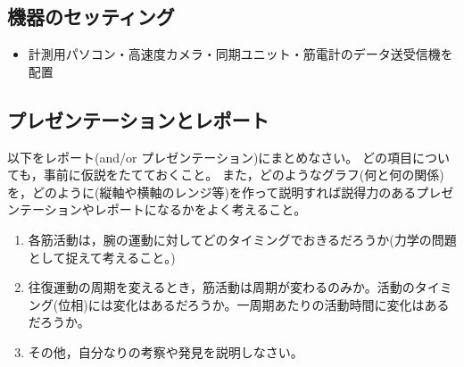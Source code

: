 \documentclass{jsarticle}
\begin{document}
\subsection{機器のセッティング}
\begin{itemize}
\item 計測用パソコン・高速度カメラ・同期ユニット・筋電計のデータ送受信機を配置
\end{itemize}

\subsection{プレゼンテーションとレポート}

以下をレポート(and/or プレゼンテーション)にまとめなさい。
どの項目についても，事前に仮説をたてておくこと。
また，どのようなグラフ(何と何の関係)を，どのように(縦軸や横軸のレンジ等)を作って説明すれば説得力のあるプレゼンテーションやレポートになるかをよく考えること。


\begin{enumerate}
  \item 各筋活動は，腕の運動に対してどのタイミングでおきるだろうか(力学の問題として捉えて考えること。)
  \item  往復運動の周期を変えるとき，筋活動は周期が変わるのみか。活動のタイミング(位相)には変化はあるだろうか。一周期あたりの活動時間に変化はあるだろうか。
  \item その他，自分なりの考察や発見を説明しなさい。
\end{enumerate}
\end{document}
